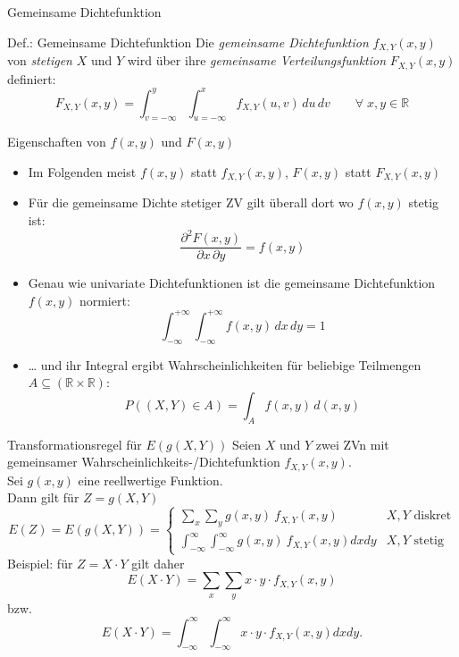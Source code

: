 \documentclass[
  10pt,
  ignorenonframetext,
]{beamer}
\providecommand{\tightlist}{%
  \setlength{\itemsep}{0pt}\setlength{\parskip}{0pt}}
\begin{document}
\begin{frame}{Gemeinsame Dichtefunktion}
\label{gemeinsame-dichtefunktion}
\begin{block}{Def.: Gemeinsame Dichtefunktion}
\label{def.-gemeinsame-dichtefunktion}
Die \emph{gemeinsame Dichtefunktion} \(f_{X,Y}(x,y)\) von
\emph{stetigen} \(X\) und \(Y\) wird über ihre \emph{gemeinsame
Verteilungsfunktion} \(F_{X,Y}(x,y)\) definiert: \[
F_{X,Y}(x,y) = \int_{v = -\infty}^y \int_{u = -\infty}^x f_{X,Y}(u,v)\,du\,dv \qquad\forall\; x,y \in \mathbb{R}
\]
\end{block}
\end{frame}

\begin{frame}{Eigenschaften von \(f(x,y)\) und \(F(x,y)\)}
\label{eigenschaften-von-fxy-und-fxy}
\begin{itemize}
\tightlist
\item
  Im Folgenden meist \(f(x,y)\) statt \(f_{X,Y}(x,y)\), \(F(x,y)\) statt
  \(F_{X,Y}(x,y)\)
\item
  Für die gemeinsame Dichte stetiger ZV gilt überall dort wo \(f(x,y)\)
  stetig ist: \[
  \frac{\partial^2 F(x,y)}{\partial x \, \partial y} = f(x,y)
  \]
\item
  Genau wie univariate Dichtefunktionen ist die gemeinsame
  Dichtefunktion \(f(x,y)\) normiert: \[
  \int_{-\infty}^{+\infty} \int_{-\infty}^{+\infty} f(x,y) \, dx \, dy = 1
  \]
\item
  \ldots{} und ihr Integral ergibt Wahrscheinlichkeiten für beliebige
  Teilmengen \(A \subseteq (\mathbb{R} \times \mathbb{R})\): \[
  P((X, Y) \in A) = \int_{A} f(x, y)\, d (x, y)
  \]
\end{itemize}

\end{frame}

\begin{frame}{Transformationsregel für \(E(g(X, Y))\)}
\label{transformationsregel-fuxfcr-egx-y}
Seien \(X\) und \(Y\) zwei ZVn mit gemeinsamer
Wahrscheinlichkeits-/Dichtefunktion \(f_{X,Y}(x,y)\).\\
Sei \(g(x, y)\) eine reellwertige Funktion.\\
Dann gilt für \(Z = g(X, Y)\) \[
E(Z)=E(g(X, Y)) = \begin{cases} \sum_x \sum_y g(x,y) \: f_{X,Y}(x,y) & X, Y \text{ diskret}\\
\int_{-\infty}^{\infty} \int_{-\infty}^{\infty} g(x,y) \: f_{X,Y}(x,y) dx dy & X, Y \text{ stetig}
\end{cases}
\] Beispiel: für \(Z = X \cdot Y\) gilt daher \[
E(X \cdot Y) = \sum_x \sum_y x \cdot y \cdot  f_{X,Y}(x,y)
\] bzw. \[
E(X \cdot Y) =  \int_{-\infty}^{\infty} \int_{-\infty}^{\infty} x \cdot y \cdot  f_{X,Y}(x,y)dx dy  \mbox{.}
\]
\end{frame}
\end{document}
